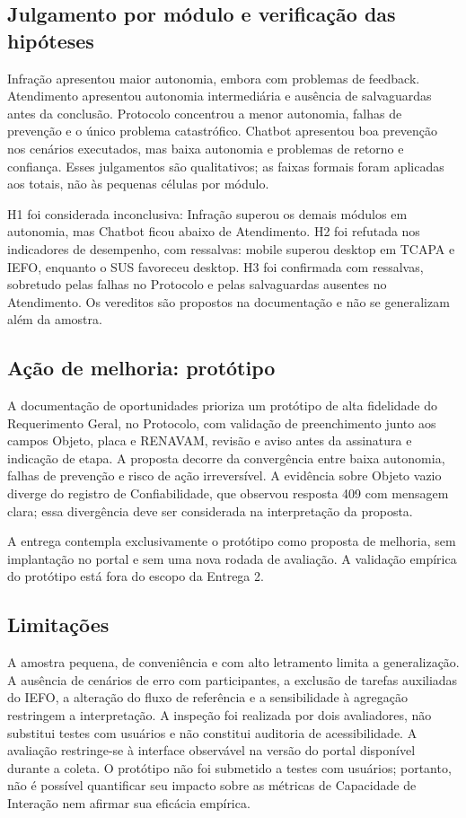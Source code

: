 \documentclass[12pt]{article}
\begin{document}
\subsection{Julgamento por módulo e verificação das hipóteses}
Infração apresentou maior autonomia, embora com problemas de feedback. Atendimento apresentou autonomia intermediária e ausência de salvaguardas antes da conclusão. Protocolo concentrou a menor autonomia, falhas de prevenção e o único problema catastrófico. Chatbot apresentou boa prevenção nos cenários executados, mas baixa autonomia e problemas de retorno e confiança. Esses julgamentos são qualitativos; as faixas formais foram aplicadas aos totais, não às pequenas células por módulo.

H1 foi considerada inconclusiva: Infração superou os demais módulos em autonomia, mas Chatbot ficou abaixo de Atendimento. H2 foi refutada nos indicadores de desempenho, com ressalvas: mobile superou desktop em TCAPA e IEFO, enquanto o SUS favoreceu desktop. H3 foi confirmada com ressalvas, sobretudo pelas falhas no Protocolo e pelas salvaguardas ausentes no Atendimento. Os vereditos são propostos na documentação e não se generalizam além da amostra.

\subsection{Ação de melhoria: protótipo}
A documentação de oportunidades prioriza um protótipo de alta fidelidade do Requerimento Geral, no Protocolo, com validação de preenchimento junto aos campos Objeto, placa e RENAVAM, revisão e aviso antes da assinatura e indicação de etapa. A proposta decorre da convergência entre baixa autonomia, falhas de prevenção e risco de ação irreversível. A evidência sobre Objeto vazio diverge do registro de Confiabilidade, que observou resposta 409 com mensagem clara; essa divergência deve ser considerada na interpretação da proposta.

A entrega contempla exclusivamente o protótipo como proposta de melhoria, sem implantação no portal e sem uma nova rodada de avaliação. A validação empírica do protótipo está fora do escopo da Entrega 2.

\subsection{Limitações}
A amostra pequena, de conveniência e com alto letramento limita a generalização. A ausência de cenários de erro com participantes, a exclusão de tarefas auxiliadas do IEFO, a alteração do fluxo de referência e a sensibilidade à agregação restringem a interpretação. A inspeção foi realizada por dois avaliadores, não substitui testes com usuários e não constitui auditoria de acessibilidade. A avaliação restringe-se à interface observável na versão do portal disponível durante a coleta. O protótipo não foi submetido a testes com usuários; portanto, não é possível quantificar seu impacto sobre as métricas de Capacidade de Interação nem afirmar sua eficácia empírica.
\end{document}
